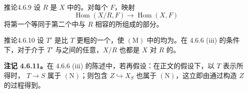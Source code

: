 \begin{SGAresult}{推论}{4.6.9}
设 $R$ 是 $X$ 中的。对每个 $F$，映射
\[
\operatorname{Hom}(X/R,F)\longrightarrow\operatorname{Hom}(X,F)
\]
将第一个等同于第二个中与 $R$ 相容的所组成的部分。
\end{SGAresult}
\begin{SGAresult}{推论}{4.6.10}
设 $T'$ 是比 $T$ 更粗的一个，使 $(\mathrm M)$ 中的均为。在 4.6.6 (iii) 的条件下，对于介于 $T'$ 与之间的任意，$X/R$ 也都是 $X$ 对 $R$ 的。
\end{SGAresult}
\textbf{注记 4.6.11。}在 4.6.6 (iii) 的陈述中，若再假设：在正文的假设下，以 $T$ 表示所得时， $T\to S$ 属于 $(\mathrm N)$；则包含 $Z\hookrightarrow X_S$ 也属于 $(\mathrm N)$，这立即由通过构造 $Z$ 的过程得到。

